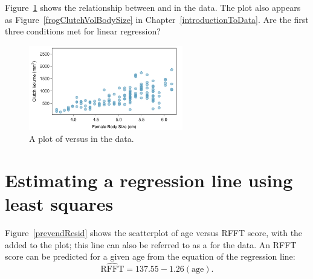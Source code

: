 \begin{exercisewrap}
\begin{nexercise}\label{nonConstantVariance}%
Figure~\ref{frogClutchVolBodySizeRegress} shows the relationship between  and  in the  data.  The plot also appears as Figure~\ref{frogClutchVolBodySize} in Chapter~\ref{introductionToData}. Are the first three conditions met for linear regression?\footnotemark{}
\end{nexercise}
\end{exercisewrap}

\begin{figure}[h]
	\centering
	\includegraphics[width=0.6\textwidth]
	{ch_01a_intro_to_data_oi_biostat/figures/frogClutchVolBodySize/frogClutchVolBodySize}
	\caption{A plot of  versus  in the  data.}
	\label{frogClutchVolBodySizeRegress}
\end{figure}

\section[Estimating a regression line using least squares]{\hspace{-1.5mm}Estimating a regression line using least squares}
\label{estimatingLeastSquaresLine}



Figure~\ref{prevendResid} shows the scatterplot of age versus RFFT score, with the  added to the plot; this line can also be referred to as a  for the data. An RFFT score can be predicted for a given age from the equation of the regression line:
\[\widehat{\text{RFFT}} = 137.55 - 1.26(\text{age}). \]



